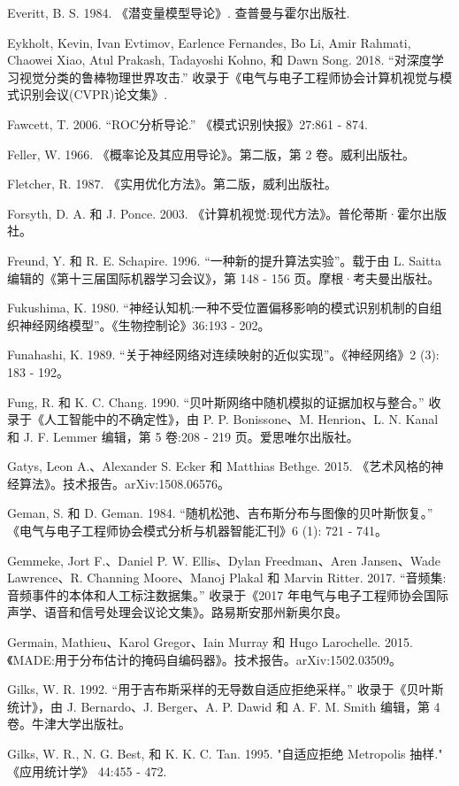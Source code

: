 \documentclass[10pt]{report}
\begin{document}
Everitt, B. S. 1984. 《潜变量模型导论》. 查普曼与霍尔出版社.

Eykholt, Kevin, Ivan Evtimov, Earlence Fernandes, Bo Li, Amir Rahmati, Chaowei Xiao, Atul Prakash, Tadayoshi Kohno, 和 Dawn Song. 2018. “对深度学习视觉分类的鲁棒物理世界攻击.” 收录于《电气与电子工程师协会计算机视觉与模式识别会议(CVPR)论文集》.

Fawcett, T. 2006. “ROC分析导论.” 《模式识别快报》27:861 - 874.

Feller, W. 1966. 《概率论及其应用导论》。第二版，第 2 卷。威利出版社。

Fletcher, R. 1987. 《实用优化方法》。第二版，威利出版社。

Forsyth, D. A. 和 J. Ponce. 2003. 《计算机视觉:现代方法》。普伦蒂斯·霍尔出版社。

Freund, Y. 和 R. E. Schapire. 1996. “一种新的提升算法实验”。载于由 L. Saitta 编辑的《第十三届国际机器学习会议》，第 148 - 156 页。摩根·考夫曼出版社。

Fukushima, K. 1980. “神经认知机:一种不受位置偏移影响的模式识别机制的自组织神经网络模型”。《生物控制论》36:193 - 202。

Funahashi, K. 1989. “关于神经网络对连续映射的近似实现”。《神经网络》2 (3): 183 - 192。

Fung, R. 和 K. C. Chang. 1990. “贝叶斯网络中随机模拟的证据加权与整合。” 收录于《人工智能中的不确定性》，由 P. P. Bonissone、M. Henrion、L. N. Kanal 和 J. F. Lemmer 编辑，第 5 卷:208 - 219 页。爱思唯尔出版社。

Gatys, Leon A.、Alexander S. Ecker 和 Matthias Bethge. 2015. 《艺术风格的神经算法》。技术报告。arXiv:1508.06576。

Geman, S. 和 D. Geman. 1984. “随机松弛、吉布斯分布与图像的贝叶斯恢复。” 《电气与电子工程师协会模式分析与机器智能汇刊》6 (1): 721 - 741。

Gemmeke, Jort F.、Daniel P. W. Ellis、Dylan Freedman、Aren Jansen、Wade Lawrence、R. Channing Moore、Manoj Plakal 和 Marvin Ritter. 2017. “音频集:音频事件的本体和人工标注数据集。” 收录于《2017 年电气与电子工程师协会国际声学、语音和信号处理会议论文集》。路易斯安那州新奥尔良。

Germain, Mathieu、Karol Gregor、Iain Murray 和 Hugo Larochelle. 2015. 《MADE:用于分布估计的掩码自编码器》。技术报告。arXiv:1502.03509。

Gilks, W. R. 1992. “用于吉布斯采样的无导数自适应拒绝采样。” 收录于《贝叶斯统计》，由 J. Bernardo、J. Berger、A. P. Dawid 和 A. F. M. Smith 编辑，第 4 卷。牛津大学出版社。

Gilks, W. R., N. G. Best, 和 K. K. C. Tan. 1995. "自适应拒绝 Metropolis 抽样." 《应用统计学》 44:455 - 472.
\end{document}
